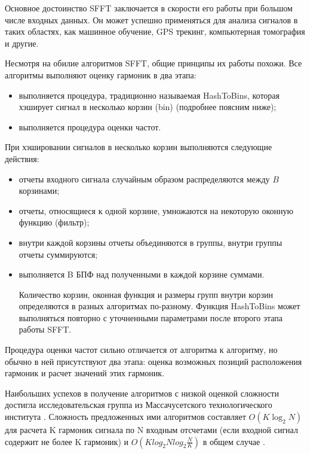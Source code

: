 Основное достоинство SFFT заключается в скорости его работы при большом числе входных данных. Он может успешно применяться для анализа сигналов в таких областях, как машинное обучение, GPS трекинг, компьютерная томография и другие.


Несмотря на обилие алгоритмов SFFT, общие принципы их работы похожи. Все алгоритмы выполняют оценку гармоник в два этапа:

\begin{itemize}
\item выполняется процедура, традиционно называемая HashToBins, которая хэширует сигнал в несколько корзин (bin) (подробнее поясним ниже);
\item выполняется процедура оценки частот.
\end{itemize}

При хэшировании сигналов в несколько корзин выполняются следующие действия:
\begin{itemize}
\item отчеты входного сигнала случайным образом распределяются между $B$ корзинами;
\item отчеты, относящиеся к одной корзине, умножаются на некоторую
оконную функцию (фильтр);
\item внутри каждой корзины отчеты объединяются в группы, внутри группы отчеты суммируются;
\item выполняется B БПФ над полученными в каждой корзине суммами.

Количество корзин, оконная функция и размеры групп внутри корзин определяются в разных алгоритмах по-разному. Функция HashToBins может выполняться повторно с уточненными параметрами после второго этапа работы SFFT.
\end{itemize}

Процедура оценки частот сильно отличается от алгоритма к алгоритму, но обычно в ней присутствуют два этапа: оценка возможных позиций расположения гармоник и расчет значений этих гармоник.

Наибольших успехов в получение алгоритмов с низкой оценкой сложности достигла исследовательская группа из Массачусетского технологического института \cite{bottazzi2018new}. 
Сложность предложенных ими алгоритмов составляет $O(K \log_{2} N)$ для расчета K гармоник сигнала по N входным отсчетами (если входной сигнал содержит не более K гармоник) и $O(K log_{2} N log_{2} \frac{N}{K})$ в общем случае \cite{indyk2014sparse, indyk2014nearly}.

